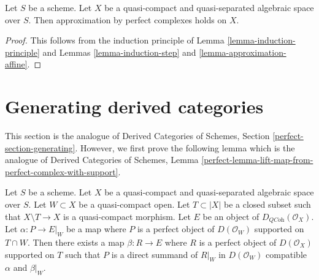 \begin{theorem}
\label{theorem-approximation}
Let $S$ be a scheme.
Let $X$ be a quasi-compact and quasi-separated algebraic space over $S$.
Then approximation by perfect complexes holds on $X$.
\end{theorem}

\begin{proof}
This follows from the induction principle of
Lemma \ref{lemma-induction-principle}
and Lemmas \ref{lemma-induction-step} and \ref{lemma-approximation-affine}.
\end{proof}






\section{Generating derived categories}
\label{section-generating}

\noindent
This section is the analogue of
Derived Categories of Schemes, Section \ref{perfect-section-generating}.
However, we first prove the following lemma which is the
analogue of Derived Categories of Schemes, Lemma
\ref{perfect-lemma-lift-map-from-perfect-complex-with-support}.

\begin{lemma}
\label{lemma-lift-map-from-perfect-complex-with-support}
Let $S$ be a scheme. Let $X$ be a quasi-compact and quasi-separated
algebraic space over $S$. Let $W \subset X$ be a quasi-compact open.
Let $T \subset |X|$ be a closed subset such that
$X \setminus T \to X$ is a quasi-compact morphism.
Let $E$ be an object of $D_{\textit{QCoh}}(\mathcal{O}_X)$.
Let $\alpha : P \to E|_W$ be a map where $P$ is a perfect object of
$D(\mathcal{O}_W)$ supported on $T \cap W$. Then there exists a map
$\beta : R \to E$ where $R$ is a perfect object of $D(\mathcal{O}_X)$
supported on $T$ such that $P$ is a direct summand of $R|_W$ in
$D(\mathcal{O}_W)$ compatible $\alpha$ and $\beta|_W$.
\end{lemma}

